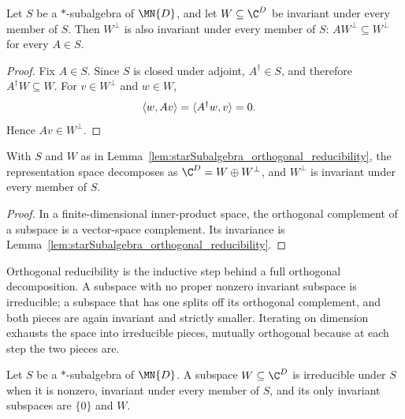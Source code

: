 \begin{lemma}%
    \label{lem:starSubalgebra_orthogonal_reducibility}
    \leanok
    Let $S$ be a $*$-subalgebra of $\MN{D}$, and let
    $W\subseteq\C^D$ be invariant under every member of $S$. Then
    $W^\perp$ is also invariant under every member of $S$:
    $AW^\perp\subseteq W^\perp$ for every $A\in S$.
\end{lemma}

\begin{proof}
    \leanok
    Fix $A\in S$. Since $S$ is closed under adjoint, $A^\dagger\in S$, and
    therefore $A^\dagger W\subseteq W$. For $v\in W^\perp$ and $w\in W$,
    \begin{align}
        \langle w,Av\rangle
        &=\langle A^\dagger w,v\rangle=0.
        \notag
    \end{align}
    Hence $Av\in W^\perp$.
\end{proof}

\begin{lemma}%
    \label{lem:starSubalgebra_isCompl_orthogonal}
    \leanok
    With $S$ and $W$ as in
    Lemma~\ref{lem:starSubalgebra_orthogonal_reducibility}, the
    representation space decomposes as
    $\C^D=W\oplus W^\perp$, and $W^\perp$ is invariant under every member
    of $S$.
\end{lemma}

\begin{proof}
    \leanok
    In a finite-dimensional inner-product space, the orthogonal complement
    of a subspace is a vector-space complement. Its invariance is
    Lemma~\ref{lem:starSubalgebra_orthogonal_reducibility}.
\end{proof}

Orthogonal reducibility is the inductive step behind a full orthogonal
decomposition. A subspace with no proper nonzero invariant subspace is
irreducible; a subspace that has one splits off its orthogonal complement,
and both pieces are again invariant and strictly smaller. Iterating on
dimension exhausts the space into irreducible pieces, mutually orthogonal
because at each step the two pieces are.

\begin{definition}%
    \label{def:starSubalgebra_irreducibleSubspace}
    \leanok
    Let $S$ be a $*$-subalgebra of $\MN{D}$. A subspace
    $W\subseteq\C^D$ is irreducible under $S$ when it is nonzero, invariant
    under every member of $S$, and its only invariant subspaces are
    $\{0\}$ and $W$.
\end{definition}

